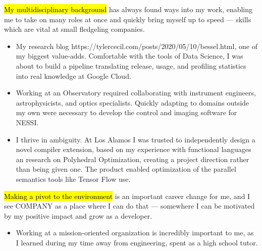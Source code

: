\documentclass{tc_cv}
\begin{document}
\begin{adjustwidth}{40pt}{40pt}
  \hl{My multidisciplinary background} has always found ways into my work,
  enabling me to take on many roles at once and quickly bring myself up to
  speed --- skills which are vital at small fledgeling companies.
  \begin{itemize}


    \item My research blog \cite{dives into
      statistics}{https://tylercecil.com/posts/2020/05/10/bessel.html}, one of
      my biggest value-adds. Comfortable with the tools of Data Science, I was
      about to build a pipeline translating release, usage, and profiling
      statistics into real knowledge at Google Cloud.

    \item Working at an Observatory required collaborating with instrument
      engineers, astrophysicists, and optics specialists. Quickly adapting to
      domains outside my own were necessary to develop the control and imaging
      software for NESSI.

    \item I thrive in ambiguity. At Los Alamos I was trusted to independently
      design a novel compiler extension, based on my experience with functional
      languages an research on Polyhedral Optimization, creating a project
      direction rather than being given one. The product enabled optimization
      of the parallel semantics tools like Tensor Flow use.
  \end{itemize} \medskip

  \hl{Making a pivot to the environment} is an important career change for me,
  and I see COMPANY as a place where I can do that --- somewhere I can be
  motivated by my positive impact and grow as a developer.
  \begin{itemize}
    \item Working at a mission-oriented organization is incredibly important
      to me, as I learned during my time away from engineering, spent as a
      high school tutor.


\end{itemize}
\end{adjustwidth}
\end{document}
